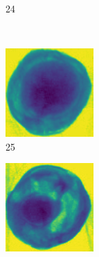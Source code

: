 \documentclass[11pt]{article}
\begin{document}
\begin{figure}[!h]
\begin{subfigure}[b]{0.22\textwidth}
         \caption{24}
         \label{fig:avo_23}
     \end{subfigure}
     \\
    \begin{subfigure}[b]{0.22\textwidth}
         \centering
         \includegraphics[width=\textwidth]{figurer/avocado_dataset/avo_24.jpg}
         \caption{25}
         \label{fig:avo_24}
     \end{subfigure}
     \hfill
     \begin{subfigure}[b]{0.22\textwidth}
         \centering
         \includegraphics[width=\textwidth]{figurer/avocado_dataset/avo_25.jpg}

\end{subfigure}
\end{figure}
\end{document}
